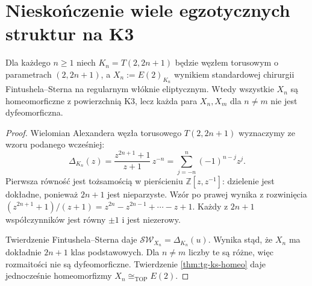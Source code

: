 \begin{center}
\end{center}

\section{Nieskończenie wiele egzotycznych struktur na K3}
\label{sec:tg-ks-infinite}

\begin{twierdzenie}
\label{thm:tg-ks-infinite}
Dla każdego $n\ge1$ niech $K_n=T(2,2n+1)$ będzie
węzłem torusowym o parametrach $(2,2n+1)$,
a $X_n:=E(2)_{K_n}$ wynikiem standardowej chirurgii
Fintushela--Sterna na regularnym włóknie eliptycznym.
Wtedy wszystkie $X_n$ są homeomorficzne z powierzchnią
K3, lecz każda para $X_n,X_m$ dla $n\ne m$
nie jest dyfeomorficzna.
\end{twierdzenie}

\begin{proof}
Wielomian Alexandera węzła torusowego
$T(2,2n+1)$ wyznaczymy ze wzoru podanego wcześniej:
\[
\Delta_{K_n}(z)
 =\frac{z^{2n+1}+1}{z+1}\,z^{-n}
 =\sum_{j=-n}^{n}(-1)^{n-j}z^j.
\]
Pierwsza równość jest tożsamością w pierścieniu
$\mathbb Z[z,z^{-1}]$: dzielenie jest dokładne,
ponieważ $2n+1$ jest nieparzyste. Wzór po prawej
wynika z rozwinięcia
$(z^{2n+1}+1)/(z+1)
=z^{2n}-z^{2n-1}+\cdots-z+1$.
Każdy z $2n+1$ współczynników jest równy $\pm1$
i jest niezerowy.

Twierdzenie Fintushela--Sterna daje
$\mathcal{SW}_{X_n}=\Delta_{K_n}(u)$.
Wynika stąd, że $X_n$ ma dokładnie $2n+1$
klas podstawowych. Dla $n\ne m$ liczby te są różne,
więc rozmaitości nie są dyfeomorficzne.
Twierdzenie \ref{thm:tg-ks-homeo} daje jednocześnie
homeomorfizmy $X_n\cong_{\mathrm{TOP}}E(2)$.
\end{proof}

